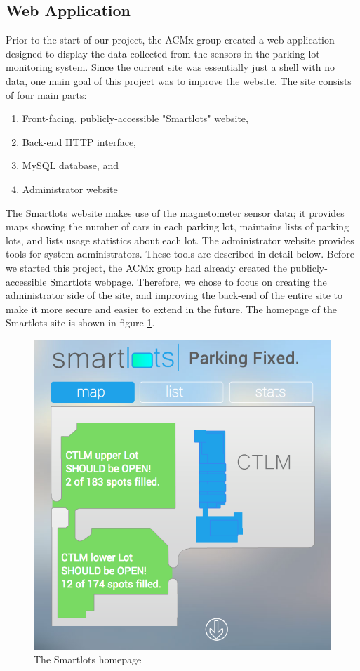 \documentclass[11pt, oneside, fullpage, doublespace]{article}
\begin{document}
\subsection{Web Application}

Prior to the start of our project, the ACMx group created a web application designed to display the data collected from the sensors in the parking lot monitoring system. Since the current site was essentially just a shell with no data, one main goal of this project was to improve the website. The site consists of four main parts:

\begin{enumerate}
\item Front-facing, publicly-accessible "Smartlots" website,
\item Back-end HTTP interface,
\item MySQL database, and
\item Administrator website
\end{enumerate}

The Smartlots website makes use of the magnetometer sensor data; it provides maps showing the number of cars in each parking lot, maintains lists of parking lots, and lists usage statistics about each lot. The administrator website provides tools for system administrators. These tools are described in detail below. Before we started this project, the ACMx group had already created the publicly-accessible Smartlots webpage. Therefore, we chose to focus on creating the administrator side of the site, and improving the back-end of the entire site to make it more secure and easier to extend in the future. The homepage of the Smartlots site is shown in figure \ref{fig:homepage}.

\begin{figure}
\begin{center}
\includegraphics[width=4.5in]{homepage}
\end{center}
\caption{The Smartlots homepage}
\label{fig:homepage}
\end{figure}
\end{document}
